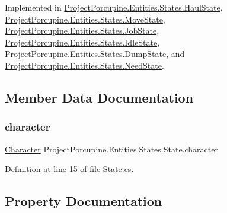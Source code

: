 Implemented in \hyperlink{class_project_porcupine_1_1_entities_1_1_states_1_1_haul_state_a67ae03ea7f3d877eb04c86e8594cb09f}{Project\+Porcupine.\+Entities.\+States.\+Haul\+State}, \hyperlink{class_project_porcupine_1_1_entities_1_1_states_1_1_move_state_ab808623899b7a874f6bf6689ebca7def}{Project\+Porcupine.\+Entities.\+States.\+Move\+State}, \hyperlink{class_project_porcupine_1_1_entities_1_1_states_1_1_job_state_a78be509101aa1172cdac8b0dd90b8412}{Project\+Porcupine.\+Entities.\+States.\+Job\+State}, \hyperlink{class_project_porcupine_1_1_entities_1_1_states_1_1_idle_state_acb8508997e5c56a5da15c054a4b691a3}{Project\+Porcupine.\+Entities.\+States.\+Idle\+State}, \hyperlink{class_project_porcupine_1_1_entities_1_1_states_1_1_dump_state_a77dc842baa81adec1ae155cdb4c3cf07}{Project\+Porcupine.\+Entities.\+States.\+Dump\+State}, and \hyperlink{class_project_porcupine_1_1_entities_1_1_states_1_1_need_state_a7719ba9d0ec106d384cb84f40e89b885}{Project\+Porcupine.\+Entities.\+States.\+Need\+State}.



\subsection{Member Data Documentation}
\mbox{\label{class_project_porcupine_1_1_entities_1_1_states_1_1_state_a0647dd5dacc8fba22b1c462c954180c7}} 
\subsubsection{\texorpdfstring{character}{character}}
{\footnotesize\ttfamily \hyperlink{class_project_porcupine_1_1_entities_1_1_character}{Character} Project\+Porcupine.\+Entities.\+States.\+State.\+character\hspace{0.3cm}{\ttfamily [protected]}}



Definition at line 15 of file State.\+cs.



\subsection{Property Documentation}
\mbox{\label{class_project_porcupine_1_1_entities_1_1_states_1_1_state_a6f88eac7c687ff082d5eff3d8a3b5b36}} 
